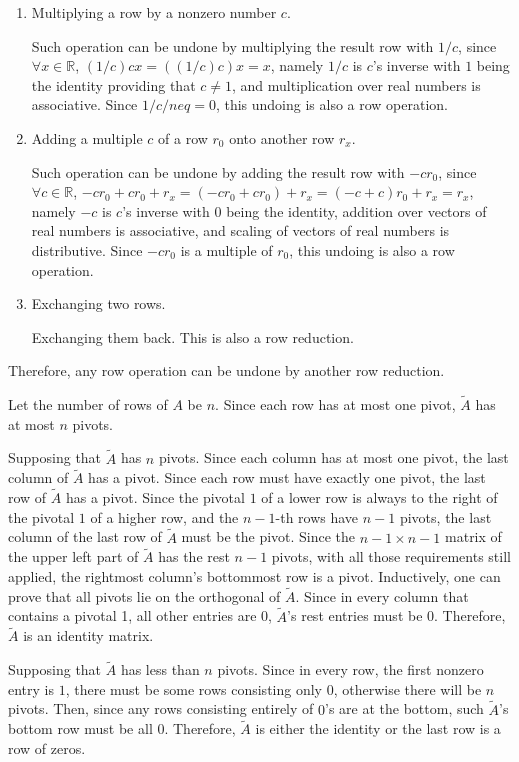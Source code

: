 \begin{exercise}{5}
  \begin{enumerate}
    \item Multiplying a row by a nonzero number $c$.
    
        Such operation can be undone by multiplying the result row with $1/c$, since $\forall x \in \mathbb{R}$, $(1/c)cx = ((1/c)c)x = x$, namely $1/c$ is $c$'s inverse with $1$ being the identity providing that $c \neq 1$, and multiplication over real numbers is associative. Since $1/c /neq = 0$, this undoing is also a row operation.
    
    \item Adding a multiple $c$ of a row $r_0$ onto another row $r_x$.
    
        Such operation can be undone by adding the result row with $-cr_0$, since $\forall c \in \mathbb{R}$, $-cr_0 + cr_0 + r_x = (-cr_0 + cr_0) + r_x = (-c+c)r_0 + r_x = r_x$, namely $-c$ is $c$'s inverse with $0$ being the identity, addition over vectors of real numbers is associative, and scaling of vectors of real numbers is distributive. Since $-cr_0$ is a multiple of $r_0$, this undoing is also a row operation.
        
    \item Exchanging two rows.
    
    Exchanging them back. This is also a row reduction.
  \end{enumerate}
  
  Therefore, any row operation can be undone by another row reduction. \rQED
\end{exercise}

\begin{exercise}{8}
  Let the number of rows of $A$ be $n$. Since each row has at most one pivot, $\widetilde{A}$ has at most $n$ pivots.
  
  Supposing that $\widetilde{A}$ has $n$ pivots. Since each column has at most one pivot, the last column of $\widetilde{A}$ has a pivot. Since each row must have exactly one pivot, the last row of $\widetilde{A}$ has a pivot. Since the pivotal $1$ of a lower row is always to the right of the pivotal $1$ of a higher row, and the $n-1$-th rows have $n-1$ pivots, the last column of the last row of $\widetilde{A}$ must be the pivot. Since the $n-1 \times n-1$ matrix of the upper left part of $\widetilde{A}$ has the rest $n-1$ pivots, with all those requirements still applied, the rightmost column's bottommost row is a pivot. Inductively, one can prove that all pivots lie on the orthogonal of $\widetilde{A}$. Since in every column that contains a pivotal 1, all other entries are 0, $\widetilde{A}$'s rest entries must be 0. Therefore, $\widetilde{A}$ is an identity matrix.
  
  Supposing that $\widetilde{A}$ has less than $n$ pivots. Since in every row, the first nonzero entry is $1$, there must be some rows consisting only 0, otherwise there will be $n$ pivots. Then, since any rows consisting entirely of $0$'s are at the bottom, such $\widetilde{A}$'s bottom row must be all $0$. Therefore, $\widetilde{A}$ is either the identity or the last row is a row of zeros. \rQED
\end{exercise}